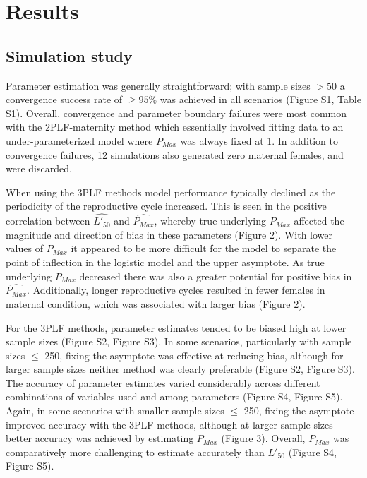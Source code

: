 \documentclass[
]{article}
\begin{document}
\section{Results}\label{results}

\subsection{Simulation study}\label{simulation-study}

Parameter estimation was generally straightforward; with sample sizes \(> 50\) a convergence success rate of \(\geq 95\%\) was achieved in all scenarios (Figure S1, Table S1). Overall, convergence and parameter boundary failures were most common with the 2PLF-maternity method which essentially involved fitting data to an under-parameterized model where \(P_{Max}\) was always fixed at 1. In addition to convergence failures, 12 simulations also generated zero maternal females, and were discarded.

When using the 3PLF methods model performance typically declined as the periodicity of the reproductive cycle increased. This is seen in the positive correlation between \(\hat{L'_{50}}\) and \(\hat{P_{Max}}\), whereby true underlying \(P_{Max}\) affected the magnitude and direction of bias in these parameters (Figure 2). With lower values of \(P_{Max}\) it appeared to be more difficult for the model to separate the point of inflection in the logistic model and the upper asymptote. As true underlying \(P_{Max}\) decreased there was also a greater potential for positive bias in \(\hat{P_{Max}}\). Additionally, longer reproductive cycles resulted in fewer females in maternal condition, which was associated with larger bias (Figure 2).

For the 3PLF methods, parameter estimates tended to be biased high at lower sample sizes (Figure S2, Figure S3). In some scenarios, particularly with sample sizes \(\leq\) 250, fixing the asymptote was effective at reducing bias, although for larger sample sizes neither method was clearly preferable (Figure S2, Figure S3). The accuracy of parameter estimates varied considerably across different combinations of variables used and among parameters (Figure S4, Figure S5). Again, in some scenarios with smaller sample sizes \(\leq\) 250, fixing the asymptote improved accuracy with the 3PLF methods, although at larger sample sizes better accuracy was achieved by estimating \(P_{Max}\) (Figure 3). Overall, \(P_{Max}\) was comparatively more challenging to estimate accurately than \(L'_{50}\) (Figure S4, Figure S5).
\end{document}

